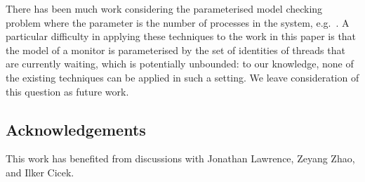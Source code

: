 There has been much work considering the parameterised model checking problem
where the parameter is the number of processes in the system,
e.g.~\cite{Lubachevsky:1984, Clarke:1987, wolper-lovinfosse89,
  sistla-german92, EN1995, Pnueli:2002, tomasz-gavin-CA, AHH16, gavin:VA22}.
A particular difficulty in applying these techniques to the work in this paper
is that the model of a monitor is parameterised by the set of identities of
threads that are currently waiting, which is potentially unbounded: to our
knowledge, none of the existing techniques can be applied in such a setting.
We leave consideration of this question as future work. 

\subsection*{Acknowledgements}

This work has benefited from discussions with Jonathan Lawrence, Zeyang Zhao,
and Ilker Cicek.




